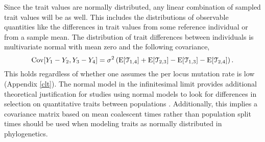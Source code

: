 Since the trait values are normally distributed, any linear combination of
sampled trait values will be as well. This includes the distributions of
observable quantities like the differences in trait values from some reference
individual or from a sample mean. The distribution of trait differences between
individuals is multivariate normal with mean zero and the following covariance,
\begin{equation}
\mathrm{Cov}[Y_1-Y_2,Y_3-Y_4] = \sigma^2\left( \mathrm{E}[\mathcal{T}_{1,4}] + \mathrm{E}[\mathcal{T}_{2,3}] -
\mathrm{E}[\mathcal{T}_{1,3}] - \mathrm{E}[\mathcal{T}_{2,4}] \right).
\end{equation}
This holds regardless of whether one assumes the per locus mutation rate is low
(Appendix \ref{clt}). The normal model in the infinitesimal limit provides
additional theoretical justification for studies using normal models to look for
differences in selection on quantitative traits between populations
\citep{Ovaskainen2011,Praebel2013,Robinson2015}. Additionally, this implies 
a covariance matrix based on mean coalescent times rather than population split
times should be used when modeling traits as normally distributed in
phylogenetics.


 
